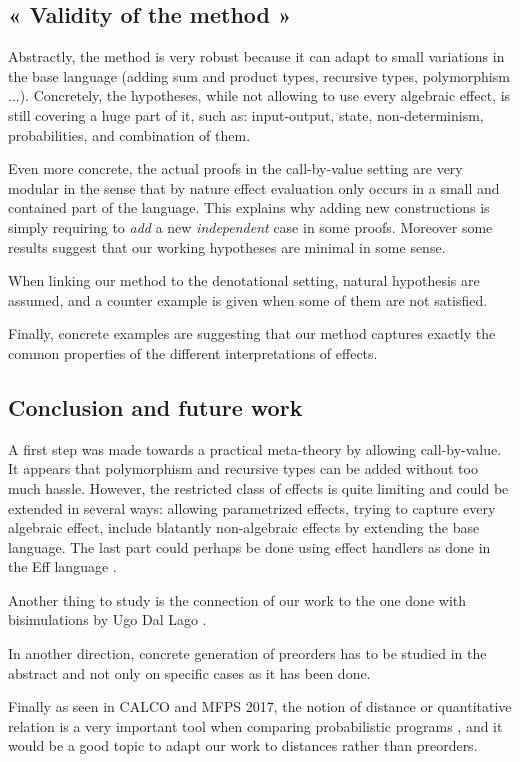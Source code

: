 \documentclass{article}
\newenvironment{point}[1]%
{\subsection*{#1}}%
{}
\begin{document}
\begin{point}{« Validity of the method »}
    
    Abstractly, the method is very robust because 
    it can adapt to small variations in the base language 
    (adding sum and product types, recursive types, 
    polymorphism ...). 
    Concretely, the hypotheses, while not allowing to use 
    every algebraic effect, is still covering a huge part of it,
    such as: input-output, state, non-determinism, probabilities,
    and combination of them. 
    
    Even more concrete, the actual proofs in the call-by-value 
    setting are very modular in the sense that  by nature
    effect evaluation only occurs in a small and contained part 
    of the language. This explains why adding new constructions 
    is simply requiring to \emph{add} a new \emph{independent} case
    in some proofs. Moreover some 
    results suggest that our working hypotheses are minimal in some 
    sense. 

    When linking our method to the denotational setting, 
    natural hypothesis are assumed, and a counter example 
    is given when some of them are not satisfied.

    Finally, concrete examples are suggesting that our 
    method captures exactly the common properties of 
    the different interpretations of effects.
\end{point}


\begin{point}{Conclusion and future work}

    A first step was made towards a practical 
    meta-theory by allowing call-by-value. It appears that polymorphism 
    and recursive types can be added without too much 
    hassle. However, the restricted class of effects 
    is quite limiting and could be extended in several 
    ways: allowing parametrized effects, 
    trying to capture every algebraic effect, 
    include blatantly non-algebraic effects by extending 
    the base language. The last part could perhaps be done using 
    effect handlers as done in the Eff language \cite{eff2012}.
    
    Another thing to study is the connection of 
    our work to the one done with bisimulations by Ugo Dal Lago \cite{Ugo2017}.
    
    In another direction, concrete generation of preorders 
    has to be studied in the abstract and not only on specific 
    cases as it has been done. 

    Finally as seen in CALCO and MFPS 2017, the notion of distance 
    or quantitative relation \cite{mardare2016quantitative}
    is a very important tool when 
    comparing probabilistic programs \cite{crubille2017metric}, and it would be 
    a good topic to adapt our work to distances rather than preorders.

\end{point}



\end{document}
